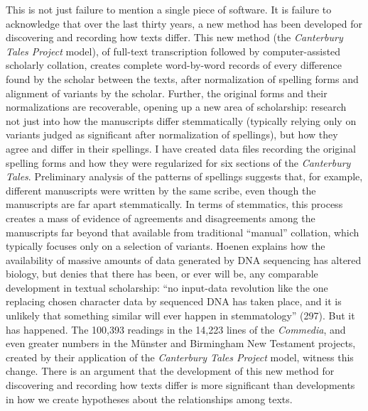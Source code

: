 \documentclass{article}
\begin{document}
This is not just failure to mention a single piece of software.
It is failure to acknowledge that over the last thirty years, a new
method has been developed for discovering and recording how texts
differ. This new method (the \emph{Canterbury Tales Project} model), of
full-text transcription followed by computer-assisted scholarly
collation, creates complete word-by-word records of every difference
found by the scholar between the texts, after normalization of spelling
forms and alignment of variants by the scholar. Further, the original
forms and their normalizations are recoverable, opening up a new area of
scholarship: research not just into how the manuscripts differ
stemmatically (typically relying only on variants judged as significant
after normalization of spellings), but how they agree and differ in
their spellings. I have created data files recording the original
spelling forms and how they were regularized for six sections of the
\emph{Canterbury Tales}. Preliminary analysis of the patterns of
spellings suggests that, for example, different manuscripts were written
by the same scribe, even though the manuscripts are far apart
stemmatically. In terms of stemmatics, this process creates a mass of
evidence of agreements and disagreements among the manuscripts far
beyond that available from traditional ``manual'' collation, which
typically focuses only on a selection of variants. Hoenen explains how
the availability of massive amounts of data generated by DNA sequencing
has altered biology, but denies that there has been, or ever will be,
any comparable development in textual scholarship: ``no input-data
revolution like the one replacing chosen character data by sequenced DNA
has taken place, and it is unlikely that something similar will ever
happen in stemmatology'' (297). But it has happened. The 100,393
readings in the 14,223 lines of the \emph{Commedia}, and even greater
numbers in the Münster and Birmingham New Testament projects, created by
their application of the \emph{Canterbury Tales Project} model, witness
this change. There is an argument that the development of this new
method for discovering and recording how texts differ is more
significant than developments in how we create hypotheses about the
relationships among texts.
\end{document}
